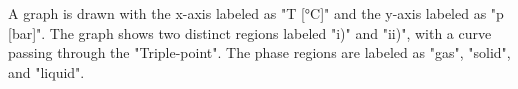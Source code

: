 A graph is drawn with the x-axis labeled as "T [°C]" and the y-axis labeled as "p [bar]". The graph shows two distinct regions labeled "i)" and "ii)", with a curve passing through the "Triple-point". The phase regions are labeled as "gas", "solid", and "liquid".